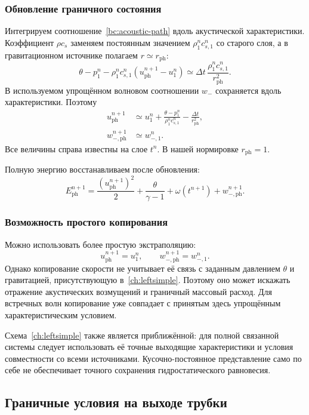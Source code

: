 \documentclass[11pt,a4paper]{article}
\begin{document}
\subsubsection{Обновление граничного состояния}

Интегрируем соотношение~\eqref{bc:acoustic-path}
вдоль акустической характеристики.
Коэффициент $\rho c_s$ заменяем постоянным
значением $\rho_1^n c_{s,1}^n$ со старого слоя,
а в гравитационном источнике полагаем
$r\simeq r_{\mathrm{ph}}$:
\[
\theta-p_1^n
-\rho_1^n c_{s,1}^n
\left(u_{\mathrm{ph}}^{n+1}-u_1^n\right)
\simeq
\Delta t\,\frac{\rho_1^n c_{s,1}^n}{r_{\mathrm{ph}}^2}.
\]
В используемом упрощённом волновом соотношении
$w_-$ сохраняется вдоль характеристики.
Поэтому
\begin{equation}
\begin{aligned}
u_{\mathrm{ph}}^{n+1}
&\simeq
u_1^n+\frac{\theta-p_1^n}{\rho_1^n c_{s,1}^n}
-\frac{\Delta t}{r_{\mathrm{ph}}^2},\\[4pt]
w_{-,\mathrm{ph}}^{n+1}
&\simeq w_{-,1}^n.
\end{aligned}
\label{ch:leftsimple}
\end{equation}
Все величины справа известны на слое $t^n$.
В нашей нормировке $r_{\mathrm{ph}}=1$.

Полную энергию восстанавливаем после обновления:
\[
E_{\mathrm{ph}}^{n+1}
=
\frac{(u_{\mathrm{ph}}^{n+1})^2}{2}
+\frac{\theta}{\gamma-1}
+\omega(t^{n+1})
+w_{-,\mathrm{ph}}^{n+1}.
\]

\subsubsection{Возможность простого копирования}

Можно использовать более простую экстраполяцию:
\[
u_{\mathrm{ph}}^{n+1}=u_1^n,\qquad
w_{-,\mathrm{ph}}^{n+1}=w_{-,1}^n.
\]
Однако копирование скорости не учитывает её связь
с заданным давлением $\theta$ и гравитацией,
присутствующую в~\eqref{ch:leftsimple}.
Поэтому оно может искажать отражение акустических
возмущений и граничный массовый расход.
Для встречных волн копирование уже совпадает
с принятым здесь упрощённым характеристическим условием.

Схема~\eqref{ch:leftsimple} также является приближённой:
для полной связанной системы следует использовать
её точные выходящие характеристики и условия
совместности со всеми источниками.
Кусочно-постоянное представление само по себе
не обеспечивает точного сохранения
гидростатического равновесия.
\subsection{Граничные условия на выходе трубки}
\end{document}
